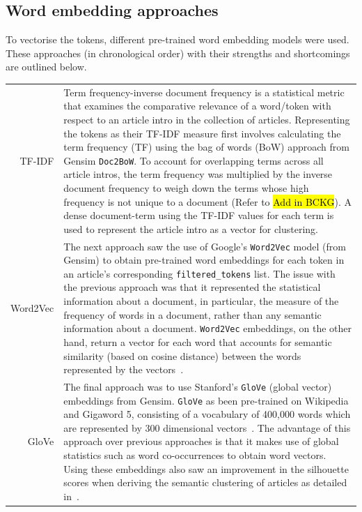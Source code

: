 \subsection{Word embedding approaches} \label{word_embed_approaches}
To vectorise the tokens, different pre-trained word embedding models were used. These approaches (in chronological order) with their strengths and shortcomings are outlined below.

\renewcommand\arraystretch{2}
\captionsetup{singlelinecheck=false, labelfont=sc, labelsep=quad}
\begin{longtable}{@{\,}r <{\hskip 2pt} !{\foo} >{\arraybackslash}p{13cm}}
\centering

TF-IDF & Term frequency-inverse document frequency is a statistical metric that examines the comparative relevance of a word/token with respect to an article intro in the collection of articles. Representing the tokens as their TF-IDF measure first involves calculating the term frequency (TF) using the bag of words (BoW) approach from Gensim \texttt{Doc2BoW}. To account for overlapping terms across all article intros, the term frequency was multiplied by the inverse document frequency to weigh down the terms whose high frequency is not unique to a document (Refer to  \hl{Add in BCKG}). A dense document-term using the TF-IDF values for each term is used to represent the article intro as a vector for clustering. \\

Word2Vec & The next approach saw the use of Google's \texttt{Word2Vec} model (from Gensim) to obtain pre-trained word embeddings for each token in an article's corresponding \texttt{filtered\_tokens} list. The issue with the previous approach was that it represented the statistical information about a document, in particular, the measure of the frequency of words in a document, rather than any semantic information about a document. \texttt{Word2Vec} embeddings, on the other hand, return a vector for each word that accounts for semantic similarity (based on cosine distance) between the words represented by the vectors~\cite{word2vec}. \\

GloVe & The final approach was to use Stanford's \texttt{GloVe} (global vector) embeddings from Gensim. \texttt{GloVe} as been pre-trained on Wikipedia and Gigaword 5, consisting of a vocabulary of 400,000 words which are represented by 300 dimensional vectors~\cite{glove}. The advantage of this approach over previous approaches is that it makes use of global statistics such as word co-occurrences to obtain word vectors. Using these embeddings also saw an improvement in the silhouette scores when deriving the semantic clustering of articles as detailed in~. \\
\end{longtable}

